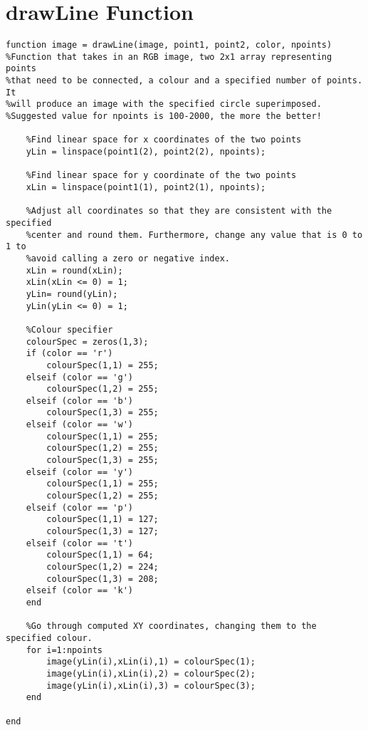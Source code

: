 \documentclass[10pt,a4paper,onecolumn]{report}
\begin{document}
\section{drawLine Function}
\begin{lstlisting}
function image = drawLine(image, point1, point2, color, npoints)
%Function that takes in an RGB image, two 2x1 array representing points
%that need to be connected, a colour and a specified number of points. It 
%will produce an image with the specified circle superimposed.
%Suggested value for npoints is 100-2000, the more the better!

    %Find linear space for x coordinates of the two points
    yLin = linspace(point1(2), point2(2), npoints);
    
    %Find linear space for y coordinate of the two points
    xLin = linspace(point1(1), point2(1), npoints);
    
    %Adjust all coordinates so that they are consistent with the specified
    %center and round them. Furthermore, change any value that is 0 to 1 to
    %avoid calling a zero or negative index.
    xLin = round(xLin);
    xLin(xLin <= 0) = 1;
    yLin= round(yLin);
    yLin(yLin <= 0) = 1;

    %Colour specifier
    colourSpec = zeros(1,3);
    if (color == 'r')
        colourSpec(1,1) = 255;
    elseif (color == 'g')
        colourSpec(1,2) = 255;
    elseif (color == 'b')
        colourSpec(1,3) = 255;
    elseif (color == 'w')
        colourSpec(1,1) = 255;
        colourSpec(1,2) = 255;
        colourSpec(1,3) = 255;
    elseif (color == 'y')
        colourSpec(1,1) = 255;
        colourSpec(1,2) = 255;
    elseif (color == 'p')
        colourSpec(1,1) = 127;
        colourSpec(1,3) = 127;
    elseif (color == 't')
        colourSpec(1,1) = 64;
        colourSpec(1,2) = 224;
        colourSpec(1,3) = 208;
    elseif (color == 'k')
    end
    
    %Go through computed XY coordinates, changing them to the specified colour.
    for i=1:npoints
        image(yLin(i),xLin(i),1) = colourSpec(1);
        image(yLin(i),xLin(i),2) = colourSpec(2);
        image(yLin(i),xLin(i),3) = colourSpec(3);
    end
    
end
\end{lstlisting}
\end{document}
